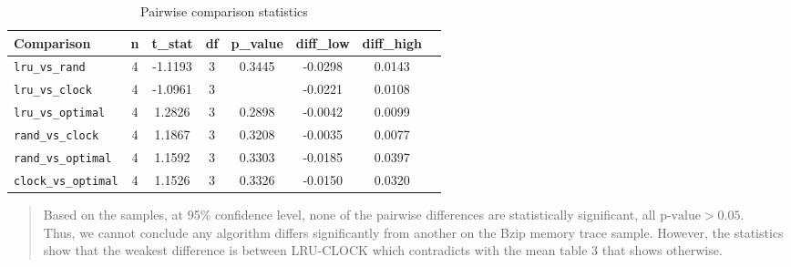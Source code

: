 \documentclass[a4paper, 11pt]{report}
\begin{document}
    \begin{table}[ht]
        \centering
        \label{tab:pairwise2}
        \begin{tabular}{l
                        S[table-format=1.0]
                        S[table-format=-1.4]
                        S[table-format=1.0]
                        S[table-format=1.4]
                        S[table-format=-1.4]
                        S[table-format=-1.4]
                        S[table-format=1.4]}
            \toprule
            {Comparison} & {n} & {t\_stat} & {df} & {p\_value} & {diff\_low} & {diff\_high} \\
            \midrule
            \texttt{lru\_vs\_rand}     & 4 & -1.1193 & 3 & 0.3445 & -0.0298 & 0.0143 \\
            \texttt{lru\_vs\_clock}    & 4 & -1.0961 & 3 &  & -0.0221 & 0.0108 \\
            \texttt{lru\_vs\_optimal}  & 4 &  1.2826 & 3 & 0.2898 & -0.0042 & 0.0099 \\
            \texttt{rand\_vs\_clock}   & 4 &  1.1867 & 3 & 0.3208 & -0.0035 & 0.0077 \\
            \texttt{rand\_vs\_optimal} & 4 &  1.1592 & 3 & 0.3303 & -0.0185 & 0.0397 \\
            \texttt{clock\_vs\_optimal}& 4 &  1.1526 & 3 & 0.3326 & -0.0150 & 0.0320 \\
            \bottomrule
        \end{tabular}
        \caption{Pairwise comparison statistics\cite{psu_paired}}
    \end{table}    
    \begin{quote}
        Based on the samples, at 95\% confidence level, none of the pairwise differences are statistically significant, all $\text{p-value}>0.05$\cite{psu_paired}.\\
        Thus, we cannot conclude any algorithm differs significantly from another on the Bzip memory trace sample. However, the statistics show that the 
        weakest difference is between LRU-CLOCK which contradicts with the mean table 3 that shows otherwise.
    \end{quote}
\end{document}
